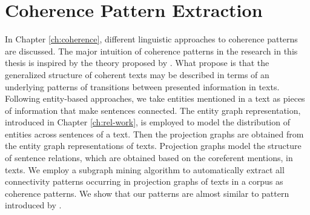 \section{Coherence Pattern Extraction}
\label{sec:pattern-extraction}

In Chapter \ref{ch:coherence}, different linguistic approaches to coherence patterns are discussed. 
The major intuition of coherence patterns in the research in this thesis is inspired by the theory proposed by . 
What  propose is that the generalized structure of coherent texts may be described in terms of an underlying patterns of transitions between presented information in texts.  
Following entity-based approaches, we take entities mentioned in a text as pieces of information that make sentences connected. 
The entity graph representation, introduced in Chapter \ref{ch:rel-work}, is employed to model the distribution of entities across sentences of a text. 
Then the projection graphs are obtained from the entity graph representations of texts. 
Projection graphs model the structure of sentence relations, which are obtained based on the coreferent mentions, in texts. 
We employ a subgraph mining algorithm to automatically extract all connectivity patterns occurring in projection graphs of texts in a corpus as coherence patterns. 
We show that our patterns are almost similar to pattern introduced by . 



